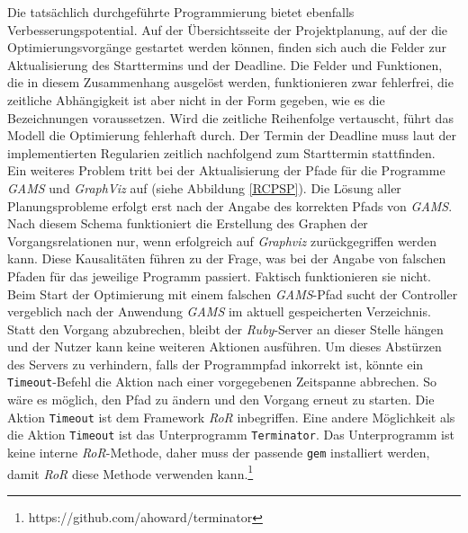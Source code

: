 \documentclass[a4paper,12pt,parskip,bibtotoc,liststotoc]{article}
\begin{document}
Die tatsächlich durchgeführte Programmierung bietet ebenfalls Verbesserungspotential. Auf der Übersichtsseite der Projektplanung, auf der die Optimierungsvorgänge gestartet werden können, finden sich auch die Felder zur Aktualisierung des Starttermins und der Deadline. Die Felder und Funktionen, die in diesem Zusammenhang ausgelöst werden, funktionieren zwar fehlerfrei, die zeitliche Abhängigkeit ist aber nicht in der Form gegeben, wie es die Bezeichnungen voraussetzen. Wird die zeitliche Reihenfolge vertauscht, führt das Modell die Optimierung fehlerhaft durch. Der Termin der Deadline muss laut der implementierten Regularien zeitlich nachfolgend zum Starttermin stattfinden. \\

Ein weiteres Problem tritt bei der Aktualisierung der Pfade für die Programme \textit{GAMS} und \textit{GraphViz} auf (siehe Abbildung \ref{RCPSP}). Die Lösung aller Planungsprobleme erfolgt erst nach der Angabe des korrekten Pfads von \textit{GAMS}. Nach diesem Schema funktioniert die Erstellung des Graphen der Vorgangsrelationen nur, wenn erfolgreich auf \textit{Graphviz} zurückgegriffen werden kann. Diese Kausalitäten führen zu der Frage, was bei der Angabe von falschen Pfaden für das jeweilige Programm passiert. Faktisch funktionieren sie nicht. Beim Start der Optimierung mit einem falschen \textit{GAMS}-Pfad sucht der Controller vergeblich nach der Anwendung \textit{GAMS} im aktuell gespeicherten Verzeichnis. Statt den Vorgang abzubrechen, bleibt der \textit{Ruby}-Server an dieser Stelle hängen und der Nutzer kann keine weiteren Aktionen ausführen. Um dieses \glqq Abstürzen\grqq\; des Servers zu verhindern, falls der Programmpfad inkorrekt ist, könnte ein \texttt{Timeout}-Befehl die Aktion nach einer vorgegebenen Zeitspanne abbrechen. So wäre es möglich, den Pfad zu ändern und den Vorgang erneut zu starten. Die Aktion \texttt{Timeout} ist dem Framework \textit{RoR} inbegriffen. Eine andere Möglichkeit als die Aktion \texttt{Timeout} ist das Unterprogramm \texttt{Terminator}. Das Unterprogramm ist keine interne \textit{RoR}-Methode, daher muss der passende \texttt{gem} installiert werden, damit \textit{RoR} diese Methode verwenden kann.\footnote{https://github.com/ahoward/terminator}\\
\end{document}
